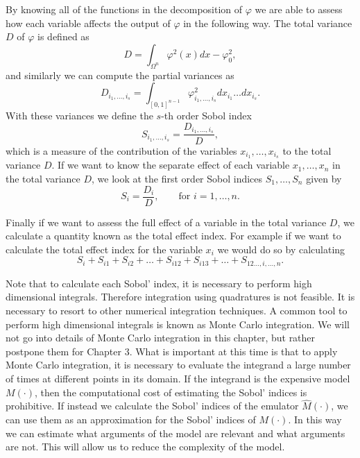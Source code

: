 \documentclass[12pt]{book}
\begin{document}
By knowing all of
the functions in the decomposition of $\varphi$ we are able  to assess how each variable 
affects the output of $\varphi$ in the following way. The total variance $D$ of $\varphi$ is defined as
\begin{equation*}
D=\int_{\Omega^{n}}\varphi^{2}(x)dx-\varphi_{0}^{2},
\end{equation*}
and similarly we can compute the partial variances as
\begin{equation*}
D_{i_{1},\ldots,i_{s}}=\int_{[0,1]^{n-1}}\varphi^{2}_{i_{1},\ldots,i_{s}}dx_{i_{1}}\ldots dx_{i_{s}}.
\end{equation*}
With these variances we define the $s$-th order  Sobol index  
\begin{equation*} 
S_{i_{1},\ldots,i_{s}}=\frac{D_{i_{1},\ldots,i_{s}}}{D},
\end{equation*}
which is a measure of the contribution of the variables $x_{i_{1}},\ldots,x_{i_{s}}$ to the total variance $D$.
If we want to know the separate effect  of each variable
$x_{1},\ldots,x_{n}$ in the total variance $D$, we look at
the first order Sobol indices $S_{1},\ldots,S_{n}$ given by
\begin{equation*}
S_{i}=\frac{D_{i}}{D},\qquad\text{for }i=1,\ldots,n.
\end{equation*}

Finally if we want to assess the full effect of a  variable  in the total variance $D$, 
we calculate a quantity known 
as the total effect index. For example if we want to calculate the total effect index
for the variable $x_{i}$ we would do so by calculating
\begin{equation*}
S_{i}+S_{i1}+S_{i2}+\ldots+S_{i12}+S_{i13}+\ldots+S_{12\ldots,i,\ldots, n}.
\end{equation*}

Note that  to calculate each  Sobol' index, it is necessary to perform 
high dimensional integrals. Therefore integration using quadratures is not feasible.
It is necessary to resort to other numerical integration techniques. A common
tool to perform high dimensional integrals is known as Monte Carlo integration. We will not
go into details of Monte Carlo integration in this chapter, but rather postpone them for Chapter 3.
What is important at this time is that to apply Monte Carlo integration, it is necessary to 
evaluate the integrand a large number of times at different points in its domain. If the 
integrand is the expensive model $M(\cdot)$, then the computational cost of estimating
the Sobol' indices is prohibitive. If instead we calculate the Sobol' indices 
of the emulator $\widehat{M}(\cdot)$, we can use them as an approximation for the Sobol'
indices of $M(\cdot)$. In this way we can estimate what arguments of the model are 
relevant and what arguments are not. This will allow us to reduce the complexity of the
model.
\end{document}
